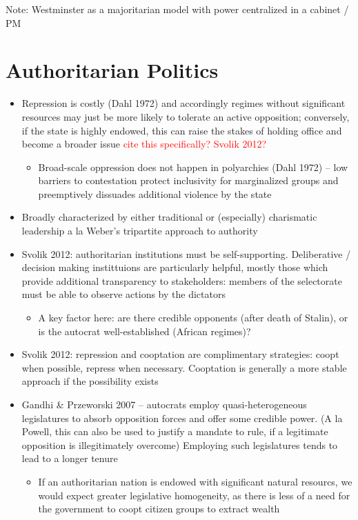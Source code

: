\documentclass[12pt]{article}
\begin{document}
Note: Westminster as a majoritarian model with power centralized in a cabinet / PM




\section*{Authoritarian Politics}

\begin{itemize}
    \item Repression is costly (Dahl 1972) and accordingly regimes without significant resources may just be more likely to tolerate an active opposition; conversely, if the state is highly endowed, this can raise the stakes of holding office and become a broader issue \textcolor{red}{cite this specifically? Svolik 2012?}
    \begin{itemize}
        \item Broad-scale oppression does not happen in polyarchies (Dahl 1972) -- low barriers to contestation protect inclusivity for marginalized groups and preemptively dissuades additional violence by the state
    \end{itemize}
    \item Broadly characterized by either traditional or (especially) charismatic leadership a la Weber's tripartite approach to authority
    \item Svolik 2012: authoritarian institutions must be self-supporting. Deliberative / decision making instittuions are particularly helpful, mostly those which provide additional transparency to stakeholders: members of the selectorate must be able to observe actions by the dictators
    \begin{itemize}
        \item A key factor here: are there credible opponents (after death of Stalin), or is the autocrat well-established (African regimes)?
    \end{itemize}
    \item Svolik 2012: repression and cooptation are complimentary strategies: coopt when possible, repress when necessary. Cooptation is generally a more stable approach if the possibility exists
    \item Gandhi \& Przeworski 2007 -- autocrats employ quasi-heterogeneous legislatures to absorb opposition forces and offer some credible power. (A la Powell, this can also be used to justify a mandate to rule, if a legitimate opposition is illegitimately overcome) Employing such legislatures tends to lead to a longer tenure
    \begin{itemize}
        \item If an authoritarian nation is endowed with significant natural resourcs, we would expect greater legislative homogeneity, as there is less of a need for the government to coopt citizen groups to extract wealth
    \end{itemize}
\end{itemize}
\end{document}

